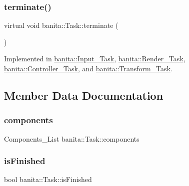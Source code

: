 \mbox{\label{classbanita_1_1_task_acccbd449402b1e9ce1ba34c26333a1b6}} 
\subsubsection{\texorpdfstring{terminate()}{terminate()}}
{\footnotesize\ttfamily virtual void banita\+::\+Task\+::terminate (\begin{DoxyParamCaption}{ }\end{DoxyParamCaption})\hspace{0.3cm}{\ttfamily [pure virtual]}}



Implemented in \mbox{\hyperlink{classbanita_1_1_input___task_af6f524863581208331f6dd08d7e1cbb5}{banita\+::\+Input\+\_\+\+Task}}, \mbox{\hyperlink{classbanita_1_1_render___task_a7518f53ea9050d2312f02ba0389188c6}{banita\+::\+Render\+\_\+\+Task}}, \mbox{\hyperlink{classbanita_1_1_controller___task_a6d1e35ea53bb0dcb64d579937dc7d5f4}{banita\+::\+Controller\+\_\+\+Task}}, and \mbox{\hyperlink{classbanita_1_1_transform___task_a95d857713fec2b3bf90d64260be0a997}{banita\+::\+Transform\+\_\+\+Task}}.



\subsection{Member Data Documentation}
\mbox{\label{classbanita_1_1_task_aa0a41413c212ad29bb32bd74d35b0585}} 
\subsubsection{\texorpdfstring{components}{components}}
{\footnotesize\ttfamily Components\+\_\+\+List banita\+::\+Task\+::components\hspace{0.3cm}{\ttfamily [protected]}}

\mbox{\label{classbanita_1_1_task_ac90bfd55ed4f8f90afa2984218c61433}} 
\subsubsection{\texorpdfstring{isFinished}{isFinished}}
{\footnotesize\ttfamily bool banita\+::\+Task\+::is\+Finished\hspace{0.3cm}{\ttfamily [protected]}}

